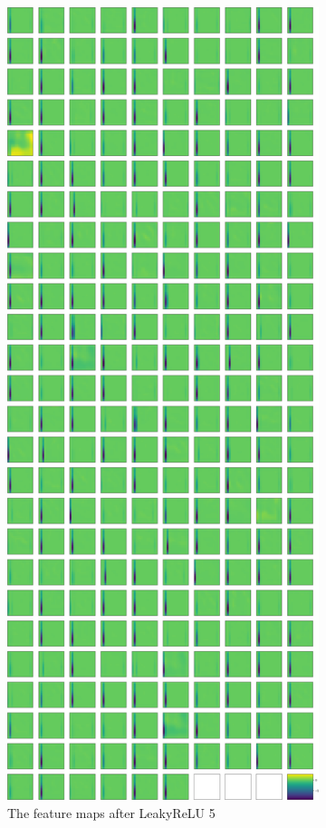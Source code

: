 \documentclass{beamer}
\begin{document}
\begin{frame}
\begin{figure}
\begin{subfigure}{0.3\textwidth}
\includegraphics[width=.8\textwidth]{images/stripes/leaky_re_lu_5.png}
\caption{The feature maps after LeakyReLU 5}
\label{subfig:lakyrelu5}
\end{subfigure}
\hfill
\begin{subfigure}{0.3\textwidth}

\end{subfigure}
\end{figure}
\end{frame}
\end{document}
